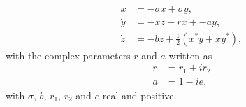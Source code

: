 \documentclass{article}
\begin{document}
\begin{preview}
\begin{align*}
\dot{x} &= -\sigma x + \sigma y, \\
\dot{y} &= -xz + rx + -ay, \\
\dot{z} &= -bz + \frac{1}{2}(x^*y+xy^*), 
\end{align*}
with the complex parameters $r$ and $a$ written as 
\begin{align*}
r&=r_1+i r_2 \\
a&=1-ie,
\end{align*}
with $\sigma$, $b$, $r_1$, $r_2$ and $e$ real and positive.
\end{preview}
\end{document}
